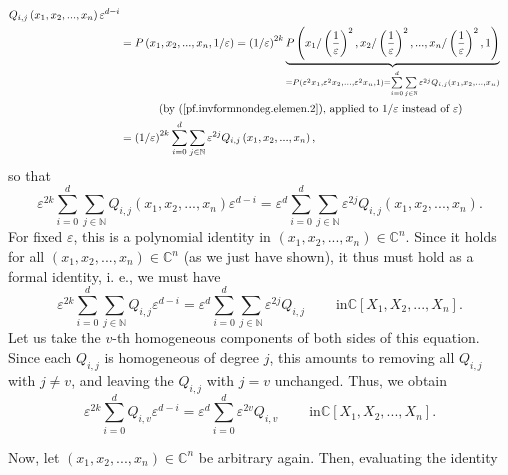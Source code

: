 \documentclass
[numbers=enddot,12pt,final,onecolumn,german,notitlepage]{scrartcl}%
\theoremstyle{definition}
\begin{document}
{\begin{align*}
{}Q_{i,j}\left(  x_{1},x_{2},...,x_{n}\right)  \varepsilon^{d-i}\\
&  =P\left(  x_{1},x_{2},...,x_{n},1/\varepsilon\right)  =\left(
1/\varepsilon\right)  ^{2k}\underbrace{P\left(  x_{1}/\left(  \dfrac
{1}{\varepsilon}\right)  ^{2},x_{2}/\left(  \dfrac{1}{\varepsilon}\right)
^{2},...,x_{n}/\left(  \dfrac{1}{\varepsilon}\right)  ^{2},1\right)
}_{=P\left(  \varepsilon^{2}x_{1},\varepsilon^{2}x_{2},...,\varepsilon
^{2}x_{n},1\right)  =\sum\limits_{i=0}^{d}\sum\limits_{j\in\mathbb{N}%
}\varepsilon^{2j}Q_{i,j}\left(  x_{1},x_{2},...,x_{n}\right)  }\\
&  \ \ \ \ \ \ \ \ \ \ \left(  \text{by (\ref{pf.invformnondeg.elemen.2}),
applied to }1/\varepsilon\text{ instead of }\varepsilon\right)  \\
&  =\left(  1/\varepsilon\right)  ^{2k}\sum\limits_{i=0}^{d}\sum
\limits_{j\in\mathbb{N}}\varepsilon^{2j}Q_{i,j}\left(  x_{1},x_{2}%
,...,x_{n}\right)  ,
\end{align*}
so that%
\[
\varepsilon^{2k}\sum\limits_{i=0}^{d}\sum\limits_{j\in\mathbb{N}}%
Q_{i,j}\left(  x_{1},x_{2},...,x_{n}\right)  \varepsilon^{d-i}=\varepsilon
^{d}\sum\limits_{i=0}^{d}\sum\limits_{j\in\mathbb{N}}\varepsilon^{2j}%
Q_{i,j}\left(  x_{1},x_{2},...,x_{n}\right)  .
\]
For fixed $\varepsilon$, this is a polynomial identity in $\left(  x_{1}%
,x_{2},...,x_{n}\right)  \in\mathbb{C}^{n}$. Since it holds for all $\left(
x_{1},x_{2},...,x_{n}\right)  \in\mathbb{C}^{n}$ (as we just have shown), it
thus must hold as a formal identity, i. e., we must have%
\[
\varepsilon^{2k}\sum\limits_{i=0}^{d}\sum\limits_{j\in\mathbb{N}}%
Q_{i,j}\varepsilon^{d-i}=\varepsilon^{d}\sum\limits_{i=0}^{d}\sum
\limits_{j\in\mathbb{N}}\varepsilon^{2j}Q_{i,j}\ \ \ \ \ \ \ \ \ \ \text{in
}\mathbb{C}\left[  X_{1},X_{2},...,X_{n}\right]  .
\]
Let us take the $v$-th homogeneous components of both sides of this equation.
Since each $Q_{i,j}$ is homogeneous of degree $j$, this amounts to removing
all $Q_{i,j}$ with $j\neq v$, and leaving the $Q_{i,j}$ with $j=v$ unchanged.
Thus, we obtain%
\begin{equation}
\varepsilon^{2k}\sum\limits_{i=0}^{d}Q_{i,v}\varepsilon^{d-i}=\varepsilon
^{d}\sum\limits_{i=0}^{d}\varepsilon^{2v}Q_{i,v}\ \ \ \ \ \ \ \ \ \ \text{in
}\mathbb{C}\left[  X_{1},X_{2},...,X_{n}\right]
.\label{pf.invformnondeg.elemen.6}%
\end{equation}
\par
Now, let $\left(  x_{1},x_{2},...,x_{n}\right)  \in\mathbb{C}^{n}$ be
arbitrary again. Then, evaluating the identity
}
\end{document}

